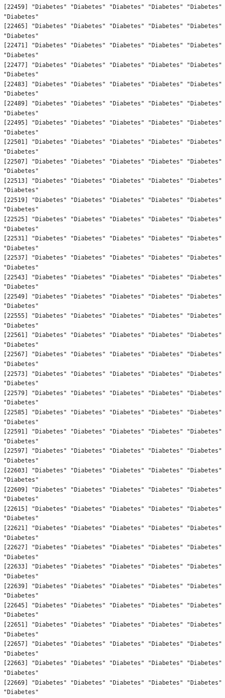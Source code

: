 \documentclass[
  letterpaper,
  DIV=11,
  numbers=noendperiod]{scrartcl}
\begin{document}
\begin{verbatim}
[22459] "Diabetes" "Diabetes" "Diabetes" "Diabetes" "Diabetes" "Diabetes"
[22465] "Diabetes" "Diabetes" "Diabetes" "Diabetes" "Diabetes" "Diabetes"
[22471] "Diabetes" "Diabetes" "Diabetes" "Diabetes" "Diabetes" "Diabetes"
[22477] "Diabetes" "Diabetes" "Diabetes" "Diabetes" "Diabetes" "Diabetes"
[22483] "Diabetes" "Diabetes" "Diabetes" "Diabetes" "Diabetes" "Diabetes"
[22489] "Diabetes" "Diabetes" "Diabetes" "Diabetes" "Diabetes" "Diabetes"
[22495] "Diabetes" "Diabetes" "Diabetes" "Diabetes" "Diabetes" "Diabetes"
[22501] "Diabetes" "Diabetes" "Diabetes" "Diabetes" "Diabetes" "Diabetes"
[22507] "Diabetes" "Diabetes" "Diabetes" "Diabetes" "Diabetes" "Diabetes"
[22513] "Diabetes" "Diabetes" "Diabetes" "Diabetes" "Diabetes" "Diabetes"
[22519] "Diabetes" "Diabetes" "Diabetes" "Diabetes" "Diabetes" "Diabetes"
[22525] "Diabetes" "Diabetes" "Diabetes" "Diabetes" "Diabetes" "Diabetes"
[22531] "Diabetes" "Diabetes" "Diabetes" "Diabetes" "Diabetes" "Diabetes"
[22537] "Diabetes" "Diabetes" "Diabetes" "Diabetes" "Diabetes" "Diabetes"
[22543] "Diabetes" "Diabetes" "Diabetes" "Diabetes" "Diabetes" "Diabetes"
[22549] "Diabetes" "Diabetes" "Diabetes" "Diabetes" "Diabetes" "Diabetes"
[22555] "Diabetes" "Diabetes" "Diabetes" "Diabetes" "Diabetes" "Diabetes"
[22561] "Diabetes" "Diabetes" "Diabetes" "Diabetes" "Diabetes" "Diabetes"
[22567] "Diabetes" "Diabetes" "Diabetes" "Diabetes" "Diabetes" "Diabetes"
[22573] "Diabetes" "Diabetes" "Diabetes" "Diabetes" "Diabetes" "Diabetes"
[22579] "Diabetes" "Diabetes" "Diabetes" "Diabetes" "Diabetes" "Diabetes"
[22585] "Diabetes" "Diabetes" "Diabetes" "Diabetes" "Diabetes" "Diabetes"
[22591] "Diabetes" "Diabetes" "Diabetes" "Diabetes" "Diabetes" "Diabetes"
[22597] "Diabetes" "Diabetes" "Diabetes" "Diabetes" "Diabetes" "Diabetes"
[22603] "Diabetes" "Diabetes" "Diabetes" "Diabetes" "Diabetes" "Diabetes"
[22609] "Diabetes" "Diabetes" "Diabetes" "Diabetes" "Diabetes" "Diabetes"
[22615] "Diabetes" "Diabetes" "Diabetes" "Diabetes" "Diabetes" "Diabetes"
[22621] "Diabetes" "Diabetes" "Diabetes" "Diabetes" "Diabetes" "Diabetes"
[22627] "Diabetes" "Diabetes" "Diabetes" "Diabetes" "Diabetes" "Diabetes"
[22633] "Diabetes" "Diabetes" "Diabetes" "Diabetes" "Diabetes" "Diabetes"
[22639] "Diabetes" "Diabetes" "Diabetes" "Diabetes" "Diabetes" "Diabetes"
[22645] "Diabetes" "Diabetes" "Diabetes" "Diabetes" "Diabetes" "Diabetes"
[22651] "Diabetes" "Diabetes" "Diabetes" "Diabetes" "Diabetes" "Diabetes"
[22657] "Diabetes" "Diabetes" "Diabetes" "Diabetes" "Diabetes" "Diabetes"
[22663] "Diabetes" "Diabetes" "Diabetes" "Diabetes" "Diabetes" "Diabetes"
[22669] "Diabetes" "Diabetes" "Diabetes" "Diabetes" "Diabetes" "Diabetes"

\end{verbatim}
\end{document}
